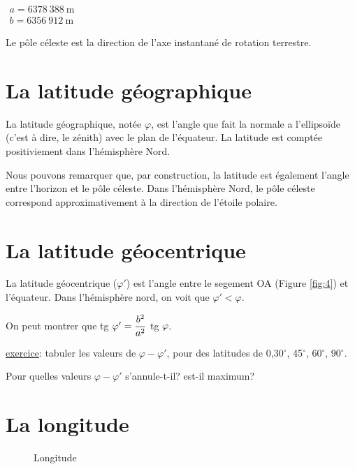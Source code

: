 \documentclass[12pt]{report}
\begin{document}
\bigskip\bigskip

$\begin{array}{lll}
a = 6 378 \  388 \ \mbox{m}\\
b = 6 356 \ 912 \  \mbox{m}
\end{array}$

\bigskip\bigskip

Le pôle céleste  est la direction de l'axe instantané de rotation terrestre.

\bigskip
 
  \par\noindent
\section{{La latitude géographique}} 
La latitude géographique, notée $\varphi$, est l'angle que fait la normale a l'ellipsoïde (c'est à dire, le zénith) avec le plan de l'équateur. La latitude est comptée positiviement dans l'hémisphère Nord.

Nous pouvons remarquer que, par construction, la latitude est également l'angle entre l'horizon et le pôle céleste. Dans l'hémisphère Nord, le pôle céleste correspond approximativement à la direction de l'étoile polaire. 

 
\section{La latitude géocentrique} 

La latitude géocentrique ($\varphi'$) est l'angle entre le segement OA (Figure \ref{fig:4}) et l'équateur. 
Dans l'hémisphère nord, on voit que $\varphi' < \varphi$.

On peut montrer que tg $\varphi' = \displaystyle {b^2\over a^2}$ tg $\varphi$. 
 
 \underline{exercice}: tabuler les valeurs de $\varphi-\varphi'$, pour des latitudes de 0,30$^\circ$, 45$^\circ$, 60$^\circ$, 90$^\circ$.
 
 Pour quelles valeurs $\varphi-\varphi'$ s'annule-t-il? \quad est-il maximum?

\bigskip
 
  \par\noindent
\section{{La longitude}}

\begin{figure}[ht]
\begin{center}
\end{center}
\caption{Longitude}
\label{fig:5}
\end{figure}
\end{document}
